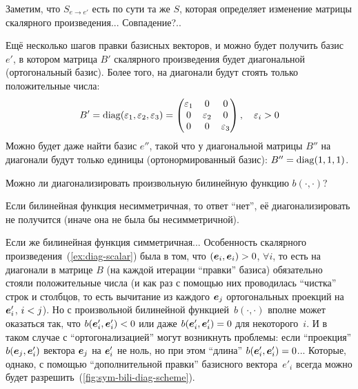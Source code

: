\documentclass[a4paper,12pt]{article}
\begin{document}
\begin{example}
    Заметим, что $S_{e \to e'}$ есть по сути та же $S$, которая определяет изменение матрицы скалярного произведения... Совпадение?..
    
    Ещё несколько шагов правки базисных векторов, и можно будет получить базис~$e'$, в котором матрица $B'$ скалярного произведения будет диагональной (ортогональный базис).
    Более того, на диагонали будут стоять только положительные числа:
    \[
      B' = \operatorname{diag}(\varepsilon_1, \varepsilon_2, \varepsilon_3) = \begin{pmatrix}
        \varepsilon_1 & 0 & 0\\
        0 & \varepsilon_2 & 0\\
        0 & 0 & \varepsilon_3
      \end{pmatrix},\quad \varepsilon_i > 0
    \]
    Можно будет даже найти базис $e''$, такой что у диагональной матрицы $B''$ на диагонали будут только единицы (ортонормированный базис): $B'' \hm= \diag(1, 1, 1)$. %
  \end{example}
  
  Можно ли диагонализировать произвольную билинейную функцию $b(\cdot, \cdot)$?
  
  Если билинейная функция несимметричная, то ответ ``нет'', её диагонализировать не получится (иначе она не была бы несимметричной).
  
  Если же билинейная функция симметричная...
  Особенность скалярного произведения~(\ref{ex:diag-scalar}) была в том, что $(\bds e_i, \bds e_i) \hm> 0$, $\forall i$, то есть на диагонали в матрице $B$ (на каждой итерации ``правки'' базиса) обязательно стояли положительные числа (и как раз с помощью них проводилась ``чистка'' строк и столбцов, то есть вычитание из каждого $\boldsymbol e_j$ ортогональных проекций на $\boldsymbol e'_i$, $i \hm< j$).
  Но с произвольной билинейной функцией~$b(\cdot, \cdot)$ вполне может оказаться так, что $b(\bds e'_i, \bds e'_i) \hm< 0$ или даже $b(\bds e'_i, \bds e'_i) \hm= 0$ для некоторого~$i$.
  И в таком случае с ``ортогонализацией'' могут возникнуть проблемы: если ``проекция'' $b(\boldsymbol e_j, \boldsymbol e_i')$ вектора $\boldsymbol e_j$ на $\boldsymbol e_i'$ не ноль, но при этом ``длина'' $b(\bds e_i', \bds e_i') \hm= 0$...
  Которые, однако, с помощью ``дополнительной правки'' базисного вектора~$e'_i$ всегда можно будет разрешить~(\ref{fig:sym-bili-diag-scheme}).
  
\end{document}
